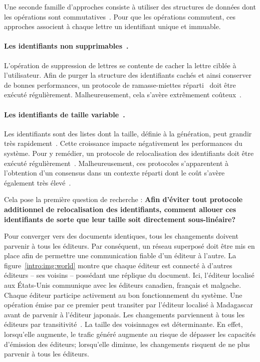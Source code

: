 Une seconde famille d'approches consiste à utiliser des structures de données
dont les opérations sont commutatives~\cite{shapiro2011conflict}. Pour que les
opérations commutent, ces approches associent à chaque lettre un identifiant
unique et immuable.

\paragraph{Les identifiants non supprimables~\cite{oster2006data}.} L'opération
de suppression de lettres se contente de cacher la lettre ciblée à
l'utilisateur. Afin de purger la structure des identifiants cachés et ainsi
conserver de bonnes performances, un protocole de ramasse-miettes
réparti~\cite{abdullahi1998garbage} doit être exécuté
régulièrement. Malheureusement, cela s'avère extrêmement
coûteux~\cite{abdullahi1998garbage}.

\paragraph{Les identifiants de taille variable~\cite{weiss2009logoot}.} Les
identifiants sont des listes dont la taille, définie à la génération, peut
grandir très rapidement~\cite{weiss2009logoot}. Cette croissance impacte
négativement les performances du système. Pour y remédier, un protocole de
relocalisation des identifiants doit être exécuté
régulièrement~\cite{zawirskiasynchronous}. Malheureusement, ces protocoles
s'apparentent à l'obtention d'un consensus dans un contexte réparti dont le coût
s'avère également très élevé~\cite{mostefaoui2015signature}.

Cela pose la première question de recherche : \textbf{Afin d'éviter tout
  protocole additionnel de relocalisation des identifiants, comment allouer ces
  identifiants de sorte que leur taille soit directement sous-linéaire?}


Pour converger vers des documents identiques, tous les changements doivent
parvenir à tous les éditeurs. Par conséquent, un réseau superposé doit être mis
en place afin de permettre une communication fiable d'un éditeur à l'autre.  La
figure~\ref{intro:img:world} montre que chaque éditeur est connecté à d'autres
éditeurs -- ses voisins -- possédant une réplique du document. Ici, l'éditeur
localisé aux États-Unis communique avec les éditeurs canadien, français et
malgache. Chaque éditeur participe activement au bon fonctionnement du
système. Une opération émise par ce premier peut transiter par l'éditeur
localisé à Madagascar avant de parvenir à l'éditeur japonais.  Les changements
parviennent à tous les éditeurs par transitivité~\cite{birman1999bimodal}.  La
taille des voisinnages est déterminante. En effet, lorsqu'elle augmente, le
trafic généré augmente au risque de dépasser les capacités d'émission des
éditeurs; lorsqu'elle diminue, les changements risquent de ne plus parvenir à
tous les éditeurs.

